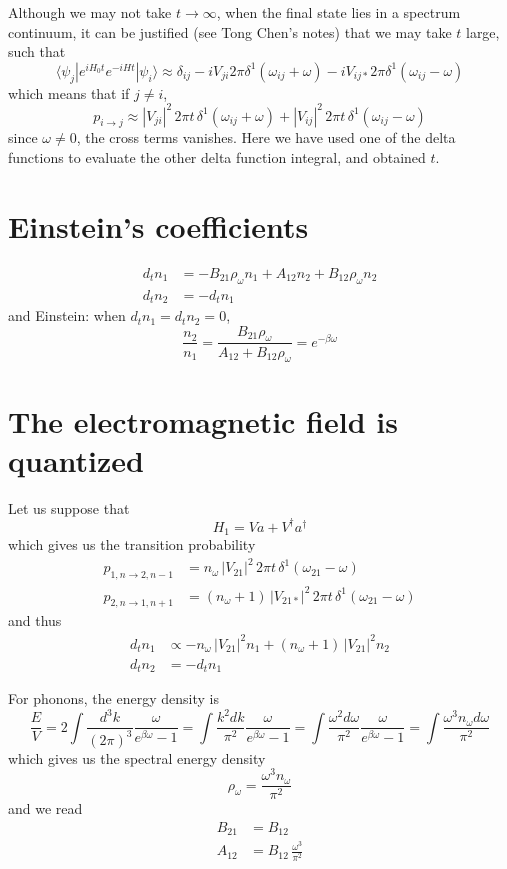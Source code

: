 \documentclass[12pt, oneside]{book}
\begin{document}
Although we may not take $t\to\infty$, when the final state lies in a spectrum continuum, it can be justified (see Tong Chen's notes) that we may take $t$ large, such that
\[
\langle\psi_j|e^{iH_0t}e^{-iHt}|\psi_i\rangle\approx\delta_{ij}-iV_{ji}2\pi\delta^1(\omega_{ij}+\omega)-iV_{ij*}2\pi\delta^1(\omega_{ij}-\omega)
\]
which means that if $j\ne i$,
\[
p_{i\to j}\approx|V_{ji}|^2\,2\pi t\,\delta^1(\omega_{ij}+\omega)+|V_{ij}|^2\,2\pi t\,\delta^1(\omega_{ij}-\omega)
\]
since $\omega\ne0$, the cross terms vanishes. Here we have used one of the delta functions to evaluate the other delta function integral, and obtained $t$.

\section*{Einstein's coefficients}
\begin{align*}
d_tn_1&=-B_{21}\rho_{\omega}n_1+A_{12}n_2+B_{12}\rho_{\omega}n_2\\
d_tn_2&=-d_tn_1
\end{align*}
and Einstein: when $d_tn_1=d_tn_2=0$,
\[
\frac{n_2}{n_1}=\frac{B_{21}\rho_{\omega}}{A_{12}+B_{12}\rho_{\omega}}=e^{-\beta\omega}
\]

\section*{The electromagnetic field is quantized}
Let us suppose that
\[
H_1=Va+V^{\dagger}a^{\dagger}
\]
which gives us the transition probability
\begin{align*}
p_{1,n\to2,n-1}&=n_{\omega}\,|V_{21}|^2\,2\pi t\,\delta^1(\omega_{21}-\omega)\\
p_{2,n\to1,n+1}&=(n_{\omega}+1)\,|V_{21*}|^2\,2\pi t\,\delta^1(\omega_{21}-\omega)
\end{align*}
and thus
\begin{align*}
d_tn_1&\propto-n_{\omega}\,|V_{21}|^2n_1+(n_{\omega}+1)\,|V_{21}|^2n_2\\
d_tn_2&=-d_tn_1
\end{align*}

For phonons, the energy density is
\[
\frac{E}{V}=2\int\frac{d^3k}{(2\pi)^3}\frac{\omega}{e^{\beta\omega}-1}=\int\frac{k^2dk}{\pi^2}\frac{\omega}{e^{\beta\omega}-1}=\int\frac{\omega^2d\omega}{\pi^2}\frac{\omega}{e^{\beta\omega}-1}=\int\frac{\omega^3n_{\omega}d\omega}{\pi^2}
\]
which gives us the spectral energy density
\[
\rho_{\omega}=\frac{\omega^3n_{\omega}}{\pi^2}
\]
and we read
\begin{align*}
B_{21}&=B_{12}\\
A_{12}&=B_{12}\,\frac{\omega^3}{\pi^2}
\end{align*}
\end{document}
